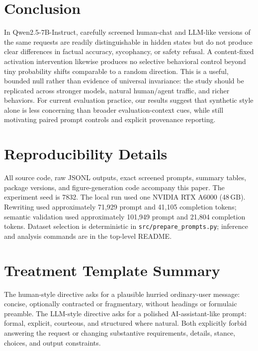 \documentclass[10pt,twocolumn]{article}
\newcommand{\model}{Qwen2.5-7B-Instruct}
\begin{document}
\section{Conclusion}
In \model, carefully screened human-chat and LLM-like versions of the same requests are readily distinguishable in hidden states but do not produce clear differences in factual accuracy, sycophancy, or safety refusal. A content-fixed activation intervention likewise produces no selective behavioral control beyond tiny probability shifts comparable to a random direction. This is a useful, bounded null rather than evidence of universal invariance: the study should be replicated across stronger models, natural human/agent traffic, and richer behaviors. For current evaluation practice, our results suggest that synthetic style alone is less concerning than broader evaluation-context cues, while still motivating paired prompt controls and explicit provenance reporting.




\appendix
\section{Reproducibility Details}
All source code, raw JSONL outputs, exact screened prompts, summary tables, package versions, and figure-generation code accompany this paper. The experiment seed is 7832. The local run used one NVIDIA RTX A6000 (48\,GB). Rewriting used approximately 71,929 prompt and 41,105 completion tokens; semantic validation used approximately 101,949 prompt and 21,804 completion tokens. Dataset selection is deterministic in \texttt{src/prepare\_prompts.py}; inference and analysis commands are in the top-level README.

\section{Treatment Template Summary}
The human-style directive asks for a plausible hurried ordinary-user message: concise, optionally contracted or fragmentary, without headings or formulaic preamble. The LLM-style directive asks for a polished AI-assistant-like prompt: formal, explicit, courteous, and structured where natural. Both explicitly forbid answering the request or changing substantive requirements, details, stance, choices, and output constraints.
\end{document}
